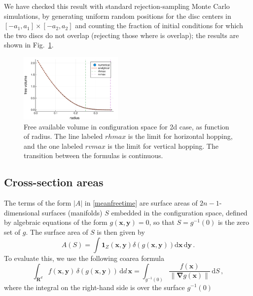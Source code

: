 \documentclass[superscriptaddress,pre,reprint,showpacs,twocolumn]{revtex4-1}
\newcommand{\rd}[1]{\mathrm{d}{#1} \,}
\newcommand{\indicatorsymbol}{\mathbf{1}}
\begin{document}
We have checked this result with standard rejection-sampling Monte Carlo simulations, 
by generating uniform random positions for the disc centers in 
$[-a_1,a_1] \times [-a_2,a_2]$ and 
counting the fraction of initial conditions for 
which the two discs do not overlap (rejecting those where is overlap); the results are shown in Fig.~\ref{VolMonteC}.


\begin{figure}[h]
\centering
\includegraphics[width=0.45\textwidth]{./figures/freevolume01.pdf}
\caption{Free available volume in configuration space for 2d case,
  as function of radius. The
  line labeled $rhmax$ is the limit for horizontal hopping, and the one labeled
  $rvmax$ is the limit for vertical hopping. The transition between the formulas
is continuous.}
\label{VolMonteC}%
\end{figure}


\subsection{Cross-section areas}\label{areas}

The terms of the form $|A|$ in \eqref{meanfreetime} are surface areas of
$2n-1$-dimensional surfaces (manifolds) $S$ embedded in the configuration space,
defined by algebraic equations of the form $g(\mathbf{x}, \mathbf{y}) = 0$,
so that $S = g^{-1}(0)$ is the zero set of $g$.
The surface area of $S$ is then given by
\begin{equation}
  A(S) = \int \indicatorsymbol_Z(\mathbf{x ,y}) \delta(g(\mathbf{x, y}))
   \rd{\mathbf{x}} \rd{\mathbf{y}}.
\label{eq:surface-area}
\end{equation}
To evaluate this, we use the following coarea formula
\cite[section 6.1]{Hormander83} 
\begin{equation}
\int_{\mathbf{R}^d} f(\mathbf{x,y}) \, \delta(g(\mathbf{x,y})) \, \rd{d} \mathbf{x} = \int_{g^{-1}(0)}\frac{f(\mathbf{x})}{\| \mathbf{\nabla}g(\mathbf{x}) \|} \, \rd{S},
\label{eq:surface-dirac}
\end{equation}
where the integral on the right-hand side is over the surface $g^{-1}(0)$
\cite{Zappa2018}
\end{document}
